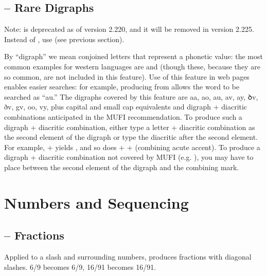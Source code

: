 \subsection{ – Rare
Digraphs}\hypertarget{ss17}{}

{\color{red}Note}:  is deprecated as of version 2.220, and it will be removed in version 2.225.
Instead of , use   (see previous section).

By “digraph” we mean conjoined letters that represent a phonetic value: the most common examples
for western languages are \textex{{\ae}} and \textex{{\oe}} (though these, because they
are so common, are not included in this feature). Use of this feature in web pages enables easier searches: for
example, producing  from
 allows the word to be
searched as “{\th}au.” The digraphs covered by this feature are \textcolor[rgb]{0.5529412,0.15686275,0.11764706}{%
aa, ao, au, av, ay, ꝺv, ðv, gv, oo, vy,} plus capital and small cap
equivalents and digraph +
diacritic combinations anticipated in the
MUFI recommendation. To produce such a digraph + diacritic combination, either type a letter + diacritic combination as
the second element of the digraph or type the diacritic after the second element. For example,
 +  yields , and so does
 +  +  (combining acute accent). To produce a digraph +
diacritic combination not covered by MUFI (e.g. ), you may have to place 
\hyperlink{cgj}{}
 between the second element of the digraph and the combining mark.

\section{Numbers and Sequencing}
\subsection{ – Fractions}
Applied to a slash and surrounding numbers, produces fractions with diagonal
slashes. 6/9 becomes {6/9}, 16/91 becomes {16/91}.

